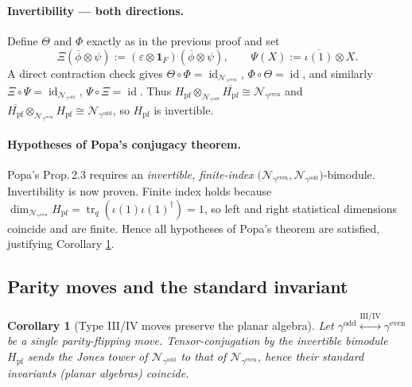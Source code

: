 \documentclass[11pt]{article}
\newtheorem{corollary}{Corollary}
\begin{document}
\paragraph{Invertibility — both directions.}
Define $\Theta$ and $\Phi$ exactly as in the previous proof and set
\[
  \Xi(\overline\phi\otimes\psi)
  :=(\varepsilon\!\otimes\!\mathbf1_F)(\overline\phi\otimes\psi),
  \qquad
  \Psi(X):=\overline{\iota(1)}\otimes X .
\]
A direct contraction check gives
$\Theta\circ\Phi=\operatorname{id}_{\mathcal N_{\gamma^{\mathrm{even}}}}$,
$\Phi\circ\Theta=\operatorname{id}$,
and similarly $\Xi\circ\Psi=\operatorname{id}_{\mathcal N_{\gamma^{\mathrm{odd}}}}$,
$\Psi\circ\Xi=\operatorname{id}$.
Thus
\(
  H_{\mathrm{pf}}\!\otimes_{\mathcal N_{\gamma^{\mathrm{odd}}}}
  \overline{H_{\mathrm{pf}}}\cong\mathcal N_{\gamma^{\mathrm{even}}}
\)
and
\(
  \overline{H_{\mathrm{pf}}}\!\otimes_{\mathcal N_{\gamma^{\mathrm{even}}}}
  H_{\mathrm{pf}}\cong\mathcal N_{\gamma^{\mathrm{odd}}}
\),
so $H_{\mathrm{pf}}$ is invertible.

\paragraph{Hypotheses of Popa’s conjugacy theorem.}
Popa’s Prop.\,2.3 requires an \emph{invertible, finite-index}
$\bigl(\mathcal N_{\gamma^{\mathrm{even}}},
\mathcal N_{\gamma^{\mathrm{odd}}}\bigr)$-bimodule.
Invertibility is now proven.  Finite index holds because
$\dim_{\mathcal N_{\gamma^{\mathrm{even}}}}H_{\mathrm{pf}}
=\operatorname{tr}_{q}(\iota(1)\iota(1)^{\dagger})=1$,
so left and right statistical dimensions coincide and are finite.
Hence all hypotheses of Popa’s theorem are satisfied, justifying
Corollary \ref{cor:parity-standard-invariant}.

\subsection*{Parity moves and the standard invariant}

\begin{corollary}[Type III/IV moves preserve the planar algebra]
  \label{cor:parity-standard-invariant}
  Let
  $\gamma^{\mathrm{odd}}\!\overset{\mathrm{III/IV}}{\leftrightarrow}
  \gamma^{\mathrm{even}}$ be a single parity-flipping move.
  Tensor-conjugation by the invertible bimodule
  $H_{\mathrm{pf}}$ sends the Jones tower of
  $\mathcal N_{\gamma^{\mathrm{odd}}}$ to that of
  $\mathcal N_{\gamma^{\mathrm{even}}}$,
  hence their standard invariants (planar algebras) coincide.
\end{corollary}
\end{document}
